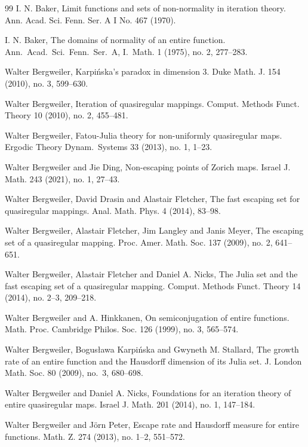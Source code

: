 \documentclass[12pt,a4paper]{amsart}
\theoremstyle{plain}
\theoremstyle{definition}
\theoremstyle{remark}
\numberwithin{equation}{section}
\begin{document}
\begin{thebibliography}{99}
I. N. Baker, 
Limit functions and sets of non-normality in iteration theory.
Ann. Acad. Sci. Fenn. Ser. A I No. 467 (1970).

I. N. Baker,
The domains of normality of an entire function.
Ann.\ Acad.\ Sci.\ Fenn.\ Ser.\ A, I.\ Math. 1 (1975), no. 2, 277--283.

Walter Bergweiler,
Karpi\'nska's paradox in dimension 3.
Duke Math. J. 154 (2010), no. 3, 599--630.

Walter Bergweiler,
Iteration of quasiregular mappings.
Comput. Methods Funct. Theory 10 (2010), no. 2, 455--481. 

Walter Bergweiler,
Fatou-Julia theory for non-uniformly quasiregular maps.
Ergodic Theory Dy\-nam.\ Systems
33 (2013), no. 1, 1--23.

Walter Bergweiler and  Jie Ding,
Non-escaping points of Zorich maps.
Israel J. Math. 243 (2021), no. 1, 27--43.

Walter Bergweiler, David Drasin and Alastair Fletcher,
The fast escaping set for quasiregular mappings.
Anal. Math. Phys. 4 (2014), 83--98.

Walter Bergweiler, Alastair Fletcher, Jim Langley and Janis Meyer,
The escaping set of a quasiregular mapping.
Proc. Amer. Math. Soc. 137 (2009), no. 2, 641--651.

Walter Bergweiler,  Alastair Fletcher and  Daniel A. Nicks,
The Julia set and the fast escaping set of a quasiregular mapping. 
Comput. Methods Funct. Theory 14 (2014), no. 2--3, 209--218.

Walter Bergweiler and A. Hinkkanen,
On semiconjugation of entire functions.
Math. Proc. Cambridge Philos. Soc. 126 (1999), no. 3, 565--574.

Walter Bergweiler, Bogus\l awa Karpi\'nska and Gwyneth M.  Stallard,
The growth rate of an entire function and the Hausdorff dimension of its Julia set.
J. London Math. Soc. 80 (2009), no.~3, 680--698.

Walter Bergweiler and Daniel A. Nicks,
Foundations for an iteration theory of entire quasiregular maps.
Israel J. Math. 201 (2014), no. 1, 147--184.

Walter Bergweiler and J\"orn Peter,
Escape rate and Hausdorff measure for entire functions.
Math. Z. 274 (2013), no. 1--2, 551--572.


\end{thebibliography}
\end{document}
